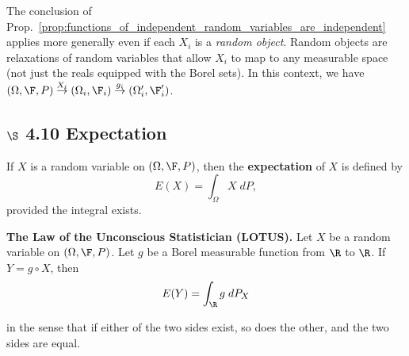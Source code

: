 \documentclass{article} %
\begin{document}
\begin{remark}{}
The conclusion of Prop.~\ref{prop:functions_of_independent_random_variables_are_independent} applies more generally even if each $X_i$ is a  \textit{random object}.  Random objects are relaxations of random variables that allow $X_i$ to map to any measurable space (not just the reals equipped with the Borel sets).  In this context, we have $(\Omega, \F, P) \stackrel{X_i}{\to} (\Omega_i, \F_i) \stackrel{g_i}{\to} (\Omega_i', \F_i')$.
\end{remark}

\subsection{$\S$ 4.10 Expectation}

\begin{definition}
If $X$ is a random variable on $(\Omega, \F, P)$, then the \textbf{expectation} of $X$ is defined by
\[  E(X) = \int_\Omega X \; dP,\] 
provided the integral exists.
\end{definition}

\begin{theorem}{\textbf{The Law of the Unconscious Statistician (LOTUS).}}
Let $X$ be a random variable on $(\Omega, \F, P)$.  Let $g$ be a Borel measurable function from $\R$ to $\R$.  If $Y = g \circ X$, then 
\begin{align}
 E(Y) = \int_\R g \; dP_X
\label{eqn:expectation_as_integral_wrt_induced_probability_measure}	
\end{align}

in the sense that if either of the two sides exist, so does the other, and the two sides are equal.
\label{thm:LOTUS}	
\end{theorem}
\end{document}
